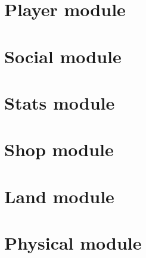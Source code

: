\documentclass{report}
\begin{document}
	\part{Player module}

	\part{Social module}

	\part{Stats module}

	\part{Shop module}

	\part{Land module}

	\part{Physical module}
\end{document}
